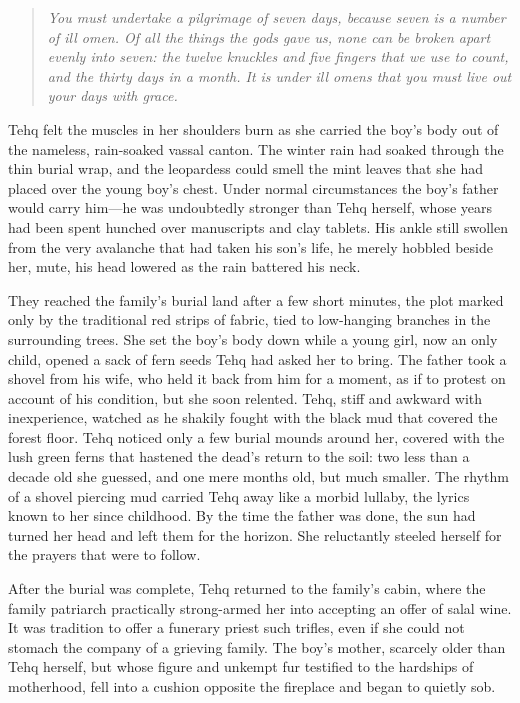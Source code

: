 \begin{quote}
\emph{You must undertake a pilgrimage of seven days, because seven is a number of ill omen. Of all the things the gods gave us, none can be broken apart evenly into seven: the twelve knuckles and five fingers that we use to count, and the thirty days in a month. It is under ill omens that you must live out your days with grace.}
\end{quote}

\noindent Tehq felt the muscles in her shoulders burn as she carried the boy's body out of the nameless, rain-soaked vassal canton. The winter rain had soaked through the thin burial wrap, and the leopardess could smell the mint leaves that she had placed over the young boy's chest. Under normal circumstances the boy's father would carry him---he was undoubtedly stronger than Tehq herself, whose years had been spent hunched over manuscripts and clay tablets. His ankle still swollen from the very avalanche that had taken his son's life, he merely hobbled beside her, mute, his head lowered as the rain battered his neck.

They reached the family's burial land after a few short minutes, the plot marked only by the traditional red strips of fabric, tied to low-hanging branches in the surrounding trees. She set the boy's body down while a young girl, now an only child, opened a sack of fern seeds Tehq had asked her to bring. The father took a shovel from his wife, who held it back from him for a moment, as if to protest on account of his condition, but she soon relented. Tehq, stiff and awkward with inexperience, watched as he shakily fought with the black mud that covered the forest floor. Tehq noticed only a few burial mounds around her, covered with the lush green ferns that hastened the dead's return to the soil: two less than a decade old she guessed, and one mere months old, but much smaller. The rhythm of a shovel piercing mud carried Tehq away like a morbid lullaby, the lyrics known to her since childhood. By the time the father was done, the sun had turned her head and left them for the horizon. She reluctantly steeled herself for the prayers that were to follow.

After the burial was complete, Tehq returned to the family's cabin, where the family patriarch practically strong-armed her into accepting an offer of salal wine. It was tradition to offer a funerary priest such trifles, even if she could not stomach the company of a grieving family. The boy's mother, scarcely older than Tehq herself, but whose figure and unkempt fur testified to the hardships of motherhood, fell into a cushion opposite the fireplace and began to quietly sob.

